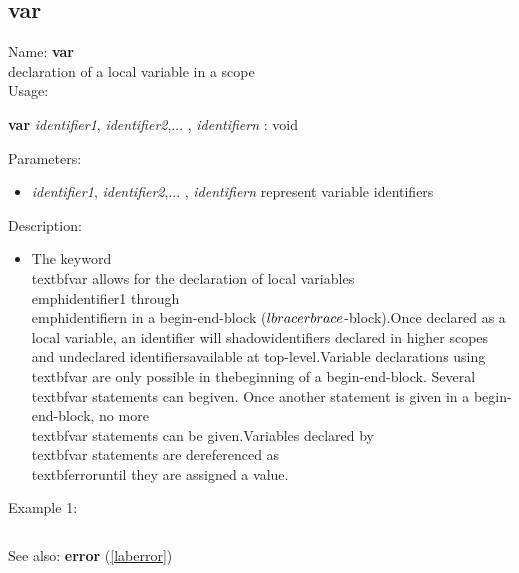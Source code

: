 \subsection{var}
\label{labvar}
\noindent Name: \textbf{var}\\
declaration of a local variable in a scope\\
\noindent Usage: 
\begin{center}
\textbf{var} \emph{identifier1}, \emph{identifier2},... , \emph{identifiern} : \textsf{void}\\
\end{center}
Parameters: 
\begin{itemize}
\item \emph{identifier1}, \emph{identifier2},... , \emph{identifiern} represent variable identifiers
\end{itemize}
\noindent Description: \begin{itemize}

\item The keyword \\textbf{var} allows for the declaration of local variables\n   \\emph{identifier1} through \\emph{identifiern} in a begin-end-block ($\\lbrace \\rbrace$-block).\n   Once declared as a local variable, an identifier will shadow\n   identifiers declared in higher scopes and undeclared identifiers\n   available at top-level.\n    \n   Variable declarations using \\textbf{var} are only possible in the\n   beginning of a begin-end-block. Several \\textbf{var} statements can be\n   given. Once another statement is given in a begin-end-block, no more\n   \\textbf{var} statements can be given.\n    \n   Variables declared by \\textbf{var} statements are dereferenced as \\textbf{error}\n   until they are assigned a value. \n\end{itemize}
\noindent Example 1: 
\begin{center}\begin{minipage}{15cm}\begin{Verbatim}[frame=single]
\end{Verbatim}
\end{minipage}\end{center}
See also: \textbf{error} (\ref{laberror})
